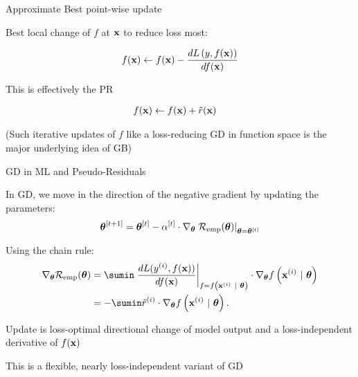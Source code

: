 \documentclass[11pt,compress,t,notes=noshow, xcolor=table]{beamer}
\begin{document}
\begin{framei}[sep=M]{Approximate Best point-wise update}

\item Best local change of $f$ at $\mathbf{x}$ to reduce loss most:

$$
	f(\mathbf{x}) \leftarrow f(\mathbf{x}) - \frac{d L\left(y, f(\mathbf{x})\right)}{d f(\mathbf{x})} 
$$

\item This is effectively the PR 

\begin{align*}
	f(\mathbf{x}) &\leftarrow f(\mathbf{x}) + \tilde{r}(\mathbf{x})
\end{align*}

\item (Such iterative updates of $f$ like a loss-reducing GD in function space is the major underlying idea of GB)

\end{framei}


\begin{framei}[sep=M]{GD in ML and Pseudo-Residuals}

	\item In GD, we move in the direction of the negative gradient by updating the parameters: 
	$$
	 \bm{\theta}^{[t + 1]} = \bm{\theta}^{[t]} - \alpha^{[t]} \cdot \nabla_{\bm{\theta}} \left.\mathcal{R}_{\text{emp}}(\bm{\theta})\right|_{\bm{\theta} = \bm{\theta}^{[t]}}	
	$$
	\item Using the chain rule:
	\begin{align*}
	\nabla_{\thetav} \risket &=\sumin \left.\frac{d L(\yi, \fx)}{d \fx} \right|_{f = \fxit} 
	\cdot \nabla_{\thetav} \fxit \\ 
	&= - \sumin \tilde r^{(i)} \cdot \nabla_{\thetav} \fxit.
	\end{align*}
	\item Update is loss-optimal directional change of model output 
        and a loss-independent derivative of $f(\mathbf{x})$
        \item This is a flexible, nearly loss-independent variant of GD


\end{framei}
\end{document}
